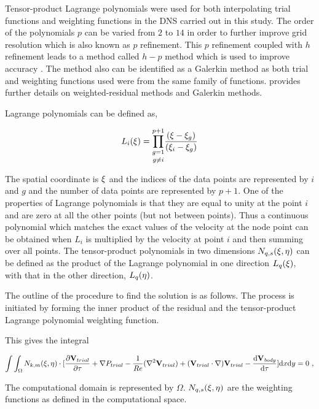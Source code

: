 Tensor-product Lagrange polynomials were used for both interpolating trial functions and weighting functions in the DNS carried out in this study. The order of the polynomials $p$ can be varied from $2$ to $14$ in order to further improve grid resolution which is also known as $p$ refinement. This $p$ refinement coupled with $h$ refinement leads to a method called $h-p$ method which is used to improve accuracy \citep{karniadakis2005}. The method also can be identified as a Galerkin method as both trial and weighting functions used were from the same family of functions. \citet{Fletcher84,Fletcher91} provides further details on weighted-residual methods and Galerkin methods. 

Lagrange polynomials can be defined as, 

\begin{equation} \centering
\label{eq:lagrange}
L_{i}(\compone) = \underset{g\neq i}{\prod_{g=1}^{p+1}}\frac{(\compone-\compone_{g})}{(\compone_{i}-\compone_{g})}
\end{equation}

The spatial coordinate is $\xi$ and the indices of the data points are represented by $i$ and $g$ and the number of data points are represented by $p+1$. One of the properties of Lagrange polynomials is that they are equal to unity at the point $i$ and are zero at all the other points (but not between points). Thus a continuous polynomial which matches the exact values of the velocity at the node point  can be obtained when  $L_{i}$ is multiplied by the velocity at point $i$ and then summing over all points. The tensor-product polynomials in two dimensions $N_{q,s}(\xi, \eta)$ can be defined as the product of the Lagrange polynomial in one direction $L_{q}(\xi)$, with that in the other direction, $L_{q}(\eta)$.

The outline of the procedure to find the solution is as follows. The process is initiated by forming the inner product of the residual and the tensor-product Lagrange polynomial weighting function.

This gives the integral 

 \begin{equation} \centering
 \label{eq:inner-prod}
 \int\int_{\Omega}N_{k,m}(\compone,\comptwo)\cdot[\pderiv{\Vtrial}{\tau} +\grad{\Ptrial} - \frac{1}{\reynoldsnumber}(\gradsq{\Vtrial}) + (\Vtrial\cdot\nabla)\Vtrial - \accframe]\mathrm{d}x\mathrm{d}y = 0 ~,
 \end{equation}
 
The computational domain is represented by $\Omega$. $N_{q,s}(\xi,\eta)$ are the weighting functions as defined in the computational space.

